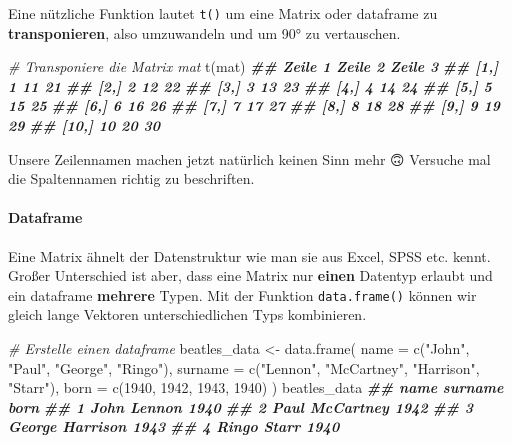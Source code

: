 \documentclass[
]{article}
\newenvironment{Shaded}{\begin{snugshade}}{\end{snugshade}}
\newcommand{\AttributeTok}[1]{\textcolor[rgb]{0.77,0.63,0.00}{#1}}
\newcommand{\CommentTok}[1]{\textcolor[rgb]{0.56,0.35,0.01}{\textit{#1}}}
\newcommand{\DecValTok}[1]{\textcolor[rgb]{0.00,0.00,0.81}{#1}}
\newcommand{\DocumentationTok}[1]{\textcolor[rgb]{0.56,0.35,0.01}{\textbf{\textit{#1}}}}
\newcommand{\FunctionTok}[1]{\textcolor[rgb]{0.00,0.00,0.00}{#1}}
\newcommand{\NormalTok}[1]{#1}
\newcommand{\OtherTok}[1]{\textcolor[rgb]{0.56,0.35,0.01}{#1}}
\newcommand{\StringTok}[1]{\textcolor[rgb]{0.31,0.60,0.02}{#1}}
\begin{document}
Eine nützliche Funktion lautet \texttt{t()} um eine Matrix oder dataframe zu \textbf{transponieren}, also umzuwandeln und um 90° zu vertauschen.

\begin{Shaded}
\begin{Highlighting}[]
\CommentTok{\# Transponiere die Matrix mat }
\FunctionTok{t}\NormalTok{(mat)}
\DocumentationTok{\#\#       Zeile 1 Zeile 2 Zeile 3}
\DocumentationTok{\#\#  [1,]       1      11      21}
\DocumentationTok{\#\#  [2,]       2      12      22}
\DocumentationTok{\#\#  [3,]       3      13      23}
\DocumentationTok{\#\#  [4,]       4      14      24}
\DocumentationTok{\#\#  [5,]       5      15      25}
\DocumentationTok{\#\#  [6,]       6      16      26}
\DocumentationTok{\#\#  [7,]       7      17      27}
\DocumentationTok{\#\#  [8,]       8      18      28}
\DocumentationTok{\#\#  [9,]       9      19      29}
\DocumentationTok{\#\# [10,]      10      20      30}
\end{Highlighting}
\end{Shaded}

Unsere Zeilennamen machen jetzt natürlich keinen Sinn mehr 🙃 Versuche mal die Spaltennamen richtig zu beschriften.

\hypertarget{dataframe}{%
\paragraph{Dataframe}\label{dataframe}}

Eine Matrix ähnelt der Datenstruktur wie man sie aus Excel, SPSS etc. kennt. Großer Unterschied ist aber, dass eine Matrix nur \textbf{einen} Datentyp erlaubt und ein dataframe \textbf{mehrere} Typen. Mit der Funktion \texttt{data.frame()} können wir gleich lange Vektoren unterschiedlichen Typs kombinieren.

\begin{Shaded}
\begin{Highlighting}[]
\CommentTok{\# Erstelle einen dataframe}
\NormalTok{beatles\_data }\OtherTok{\textless{}{-}} \FunctionTok{data.frame}\NormalTok{(}
  \AttributeTok{name =} \FunctionTok{c}\NormalTok{(}\StringTok{"John"}\NormalTok{, }\StringTok{"Paul"}\NormalTok{, }\StringTok{"George"}\NormalTok{, }\StringTok{"Ringo"}\NormalTok{),}
  \AttributeTok{surname =} \FunctionTok{c}\NormalTok{(}\StringTok{"Lennon"}\NormalTok{, }\StringTok{"McCartney"}\NormalTok{, }\StringTok{"Harrison"}\NormalTok{, }\StringTok{"Starr"}\NormalTok{),}
  \AttributeTok{born =} \FunctionTok{c}\NormalTok{(}\DecValTok{1940}\NormalTok{, }\DecValTok{1942}\NormalTok{, }\DecValTok{1943}\NormalTok{, }\DecValTok{1940}\NormalTok{)}
\NormalTok{)}
\NormalTok{beatles\_data}
\DocumentationTok{\#\#     name   surname born}
\DocumentationTok{\#\# 1   John    Lennon 1940}
\DocumentationTok{\#\# 2   Paul McCartney 1942}
\DocumentationTok{\#\# 3 George  Harrison 1943}
\DocumentationTok{\#\# 4  Ringo     Starr 1940}
\end{Highlighting}
\end{Shaded}
\end{document}
